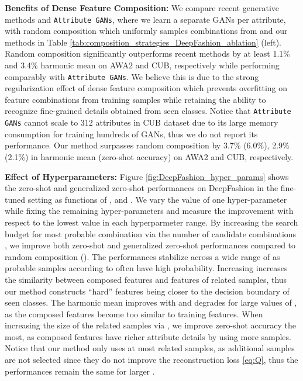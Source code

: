 \documentclass[10pt,journal,compsoc]{IEEEtran}
\newcommand{\1}{\boldsymbol{1}}
\newcommand{\0}{\boldsymbol{0}}
\newcommand{\<}{\langle}
\renewcommand{\>}{\rangle}
\newcommand{\myparagraph}[1]{\vspace{-2pt}\medskip\noindent\textbf{#1}}
\begin{document}
\myparagraph{Benefits of Dense Feature Composition:}
We compare recent generative methods and \texttt{Attribute GANs}, where we learn a separate GANs per attribute, with random composition which uniformly samples combinations from 
and our methods in Table \ref{tab:composition_strategies_DeepFashion_ablation} (left).
Random composition significantly outperforms recent methods by at least 1.1\% and 3.4\% harmonic mean on AWA2 and CUB, respectively while performing comparably with \texttt{Attribute GANs}.
We believe this is due to the strong regularization effect of dense feature composition which prevents overfitting on feature combinations from training samples while retaining the ability to recognize fine-grained details obtained from seen classes.
Notice that \texttt{Attribute GANs} cannot scale to 312 attributes in CUB dataset due to its large memory consumption for training hundreds of GANs, thus we do not report its performance.
Our method surpasses random composition by 3.7\% (6.0\%), 2.9\% (2.1\%) in harmonic mean (zero-shot accuracy) on AWA2 and CUB, respectively.

\myparagraph{Effect of Hyperparameters:}
Figure \ref{fig:DeepFashion_hyper_params} shows the zero-shot and generalized zero-shot performances on DeepFashion in the fine-tuned setting as functions of ,  and . We vary the value of one hyper-parameter while fixing the remaining hyper-parameters and measure the improvement with respect to the lowest value in each hyperparmeter range.
By increasing the search budget for most probable combination via the number of candidate combinations , we improve both zero-shot and generalized zero-shot performances compared to random composition (). 
The performances stabilize across a wide range of  as probable samples according to  often have high  probability. Increasing  increases the similarity between composed features and features of related samples, thus our method constructs ``hard'' features being closer to the decision boundary of seen classes. The harmonic mean improves with  and degrades for large values of , as the composed features become too similar to training features.
When increasing the size of the related samples via , we improve zero-shot accuracy the most, as composed features have richer attribute details by using more samples. 
Notice that our method only uses at most  related samples, as additional samples are not selected since they do not improve the reconstruction loss \eqref{eq:Q}, thus the performances remain the same for larger .
\end{document}
